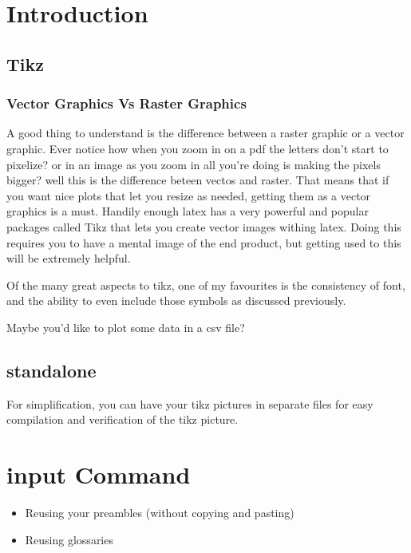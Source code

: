 \documentclass[hidelinks, float=false, crop=false]{standalone}
\begin{document}
{}
    \section{Introduction}
        \subsection{Tikz}
            \subsubsection{Vector Graphics Vs Raster Graphics}
                A good thing to understand is the difference between a raster graphic or a vector graphic. Ever notice how when you zoom in on a pdf the letters don't start to pixelize? or in an image as you zoom in all you're doing is making the pixels bigger? well this is the difference beteen vectos and raster. That means that if you want nice plots that let you resize as needed, getting them as a vector graphics is a must. Handily enough latex has a very powerful and popular packages called Tikz that lets you create vector images withing latex. Doing this requires you to have a mental image of the end product, but getting used to this will be extremely helpful.

                Of the many great aspects to tikz, one of my favourites is the consistency of font, and the ability to even include those symbols as discussed previously.


                Maybe you'd like to plot some data in a csv file?

        \subsection{standalone}
            For simplification, you can have your tikz pictures in separate files for easy compilation and verification of the tikz picture.

    \section{input Command}
        \begin{itemize}
            \item Reusing your preambles (without copying and pasting)
            \item Reusing glossaries
        \end{itemize}
\end{document}
